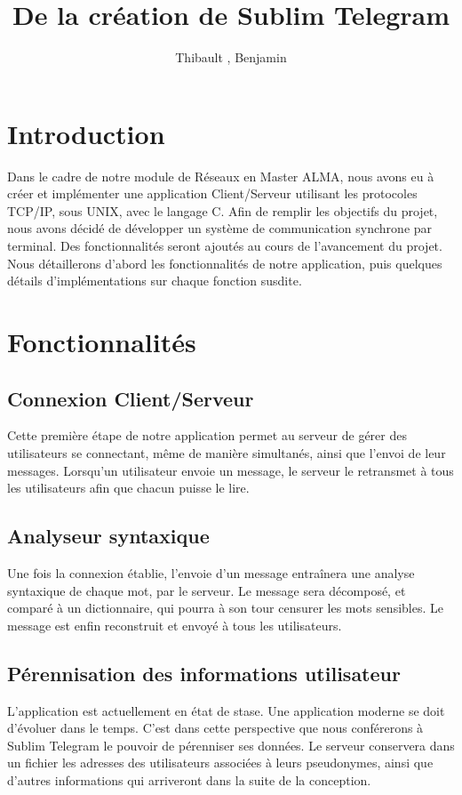 \documentclass[a4paper, 12pt]{article}
\author{Thibault \bsc{Béziers la Fosse}, Benjamin \bsc{Moreau}}
\title{De la création de Sublim Telegram}
\begin{document}
\maketitle
\clearpage
\tableofcontents
\clearpage

\section{Introduction}
Dans le cadre de notre module de Réseaux en Master ALMA, nous avons eu à créer et implémenter une application Client/Serveur utilisant les protocoles TCP/IP, sous UNIX, avec le langage C. 
Afin de remplir les objectifs du projet, nous avons décidé de développer un système de communication synchrone par terminal. Des fonctionnalités seront ajoutés au cours de l'avancement du projet. 
Nous détaillerons d'abord les fonctionnalités de notre application, puis quelques détails d'implémentations sur chaque fonction susdite. 
\section{Fonctionnalités}
\subsection{Connexion Client/Serveur}
Cette première étape de notre application permet au serveur de gérer des utilisateurs se connectant, même de manière simultanés, ainsi que l'envoi de leur messages. Lorsqu'un utilisateur envoie un message, le serveur le retransmet à tous les utilisateurs afin que chacun puisse le lire. 
\subsection{Analyseur syntaxique}
Une fois la connexion établie, l'envoie d'un message entraînera une analyse syntaxique de chaque mot, par le serveur. Le message sera décomposé, et comparé à un dictionnaire, qui pourra à son tour censurer les mots sensibles. Le message est enfin reconstruit et envoyé à tous les utilisateurs.  
\subsection{Pérennisation des informations utilisateur}
L'application est actuellement en état de stase. Une application moderne se doit d'évoluer dans le temps. C'est dans cette perspective que nous conférerons à Sublim Telegram le pouvoir de pérenniser ses données. Le serveur conservera dans un fichier les adresses des utilisateurs associées à leurs pseudonymes, ainsi que d'autres informations qui arriveront dans la suite de la conception. 
\end{document}
